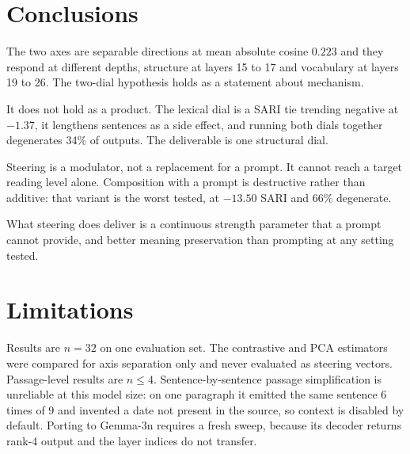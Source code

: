 \documentclass[twocolumn,10pt,a4paper]{article}
\begin{document}
\section{Conclusions}

The two axes are separable directions at mean absolute cosine $0.223$ and they
respond at different depths, structure at layers 15 to 17 and vocabulary at
layers 19 to 26. The two-dial hypothesis holds as a statement about mechanism.

It does not hold as a product. The lexical dial is a SARI tie trending negative
at $-1.37$, it lengthens sentences as a side effect, and running both dials
together degenerates 34\% of outputs. The deliverable is one structural dial.

Steering is a modulator, not a replacement for a prompt. It cannot reach a target
reading level alone. Composition with a prompt is destructive rather than
additive: that variant is the worst tested, at $-13.50$ SARI and 66\% degenerate.

What steering does deliver is a continuous strength parameter that a prompt
cannot provide, and better meaning preservation than prompting at any setting
tested.

\section{Limitations}

Results are $n=32$ on one evaluation set. The contrastive and PCA estimators were
compared for axis separation only and never evaluated as steering vectors.
Passage-level results are $n \le 4$. Sentence-by-sentence passage simplification
is unreliable at this model size: on one paragraph it emitted the same sentence 6
times of 9 and invented a date not present in the source, so context is disabled
by default. Porting to Gemma-3n requires a fresh sweep, because its decoder
returns rank-4 output and the layer indices do not transfer.

\onecolumn
\appendix
\end{document}
